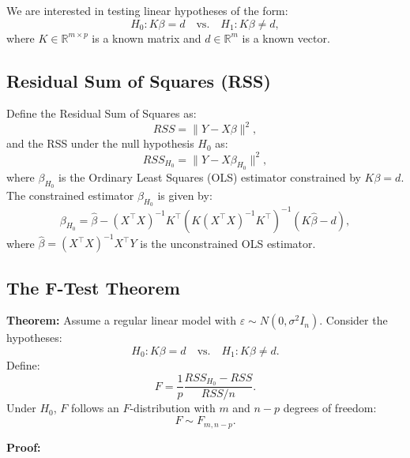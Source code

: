 \documentclass[open=any, 11pt,paper=A4]{scrreprt}
\begin{document}
We are interested in testing linear hypotheses of the form:
\[
H_0: K \beta = d \quad \text{vs.} \quad H_1: K \beta \neq d,
\]
where $K \in \mathbb{R}^{m \times p}$ is a known matrix and $d \in \mathbb{R}^m$ is a known vector.

\subsection{Residual Sum of Squares (RSS)}

Define the Residual Sum of Squares as:
\[
RSS = \|Y - X \beta \|^2,
\]
and the RSS under the null hypothesis $H_0$ as:
\[
RSS_{H_0} = \|Y - X \beta_{H_0}\|^2,
\]
where $\beta_{H_0}$ is the Ordinary Least Squares (OLS) estimator constrained by $K \beta = d$. The constrained estimator $\beta_{H_0}$ is given by:
\[
\beta_{H_0} = \hat{\beta} - (X^\top X)^{-1} K^\top \left(K (X^\top X)^{-1} K^\top \right)^{-1} (K \hat{\beta} - d),
\]
where $\hat{\beta} = (X^\top X)^{-1} X^\top Y$ is the unconstrained OLS estimator.

\subsection{The F-Test Theorem}

\textbf{Theorem:} Assume a regular linear model with $\varepsilon \sim N(0, \sigma^2 I_n)$. Consider the hypotheses:
\[
H_0: K \beta = d \quad \text{vs.} \quad H_1: K \beta \neq d.
\]
Define:
\[
F = \frac{1}{p} \frac{RSS_{H_0} - RSS}{RSS/n}.
\]
Under $H_0$, $F$ follows an $F$-distribution with $m$ and $n - p$ degrees of freedom:
\[
F \sim F_{m, n-p}.
\]

\textbf{Proof:}
\end{document}
